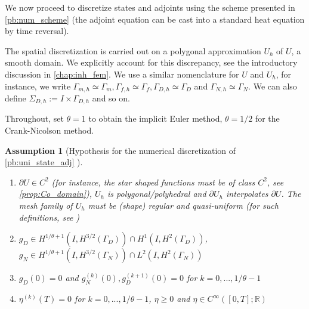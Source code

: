 \documentclass[english,a4paper,9pt,oneside]{scrbook}	%
\theoremstyle{break}
\newtheorem{ass}[equation]{Assumption}
\theoremstyle{remark}
\newcommand{\mR}{\mathbb{R}}
\begin{document}
We now proceed to discretize states and adjoints using the scheme presented in \cref{pb:num_scheme} (the adjoint equation can be cast into a standard heat equation by time reversal).



The spatial discretization is carried out on a polygonal approximation $U_h$ of $U$, a smooth domain. We explicitly account for this discrepancy, see the introductory discussion in \cref{chap:inh_fem}.  We use a similar nomenclature for $U$ and $U_h$, for instance, we write $\Gamma_{m,h}\simeq \Gamma_m, \Gamma_{f,h}\simeq \Gamma_f, \Gamma_{D,h}\simeq \Gamma_D$ and $\Gamma_{N,h}\simeq \Gamma_N$. We can also define $\Sigma_{D,h}:= I \times \Gamma_{D,h}$ and so on.


Throughout, set $\theta=1$ to obtain the implicit Euler method, $\theta=1/2$ for the Crank-Nicolson method.

\begin{ass}[Hypothesis for the numerical discretization of \cref{pb:uni_state_adj} ]
\label{ass:num_discr_shopt}
\textcolor{white}{ }
\begin{enumerate}
	\item $\partial U \in C^2$ (for instance, the star shaped functions must be of class $C^2$, see \cref{prop:Co_domain}), $U_h$ is polygonal/polyhedral and $\partial U_h$ interpolates $\partial U$. The mesh family of $U_h$ must be (shape) regular and quasi-uniform (for such definitions, see \cite{brenner_scott})
	\item $g_D \in  H^{1/\theta+1}(I,H^{3/2}(\Gamma_D)) \cap H^1(I, H^{2}(\Gamma_D))$, $g_N \in  H^{1/\theta+1}(I, H^{3/2}(\Gamma_N)) \cap L^2(I, H^{2}(\Gamma_N))$
	\item $g_D(0)=0$ and $g_N^{(k)}(0), g_D^{(k+1)}(0)  = 0$ for $k=0,..., 1/\theta-1$
	\item $\eta^{(k)}(T)  = 0$ for $k=0,..., 1/\theta-1$, $\eta \geq 0$ and $\eta \in C^{\infty}([0,T];\mR)$
\end{enumerate}

\end{ass}
\end{document}
